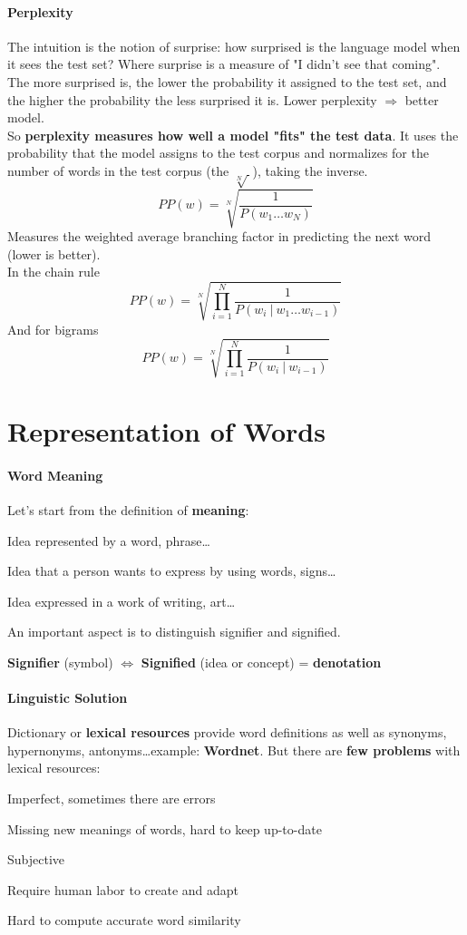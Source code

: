 \documentclass[10pt]{report}
\begin{document}
\paragraph{Perplexity} The intuition is the notion of surprise: how surprised is the language model when it sees the test set? Where surprise is a measure of "I didn't see that coming". The more surprised is, the lower the probability it assigned to the test set, and the higher the probability the less surprised it is. Lower perplexity $\Rightarrow$ better model.\\
So \textbf{perplexity measures how well a model "fits" the test data}. It uses the probability that the model assigns to the test corpus and normalizes for the number of words in the test corpus (the $\sqrt[N]{\:}$), taking the inverse. $$PP(w) = \sqrt[N]{\frac{1}{P(w_1\ldots w_N)}}$$
Measures the weighted average branching factor in predicting the next word (lower is better).\\
In the chain rule $$PP(w) = \sqrt[N]{\prod_{i=1}^N\frac{1}{P(w_i\:|\:w_1\ldots w_{i-1})}}$$
And for bigrams $$PP(w) = \sqrt[N]{\prod_{i=1}^N\frac{1}{P(w_i\:|\:w_{i-1})}}$$
\section{Representation of Words}
\paragraph{Word Meaning} Let's start from the definition of \textbf{meaning}:\begin{list}{}{}
	\item Idea represented by a word, phrase\ldots
	\item Idea that a person wants to express by using words, signs\ldots
	\item Idea expressed in a work of writing, art\ldots
\end{list}
An important aspect is to distinguish signifier and signified.
\begin{center}
	\textbf{Signifier} (symbol) $\Leftrightarrow$ \textbf{Signified} (idea or concept) = \textbf{denotation}
\end{center}
\paragraph{Linguistic Solution} Dictionary or \textbf{lexical resources} provide word definitions as well as synonyms, hypernonyms, antonyms\ldots example: \textbf{Wordnet}. But there are \textbf{few problems} with lexical resources:
\begin{list}{}{}
	\item Imperfect, sometimes there are errors
	\item Missing new meanings of words, hard to keep up-to-date
	\item Subjective
	\item Require human labor to create and adapt
	\item Hard to compute accurate word similarity
\end{list}
\end{document}
